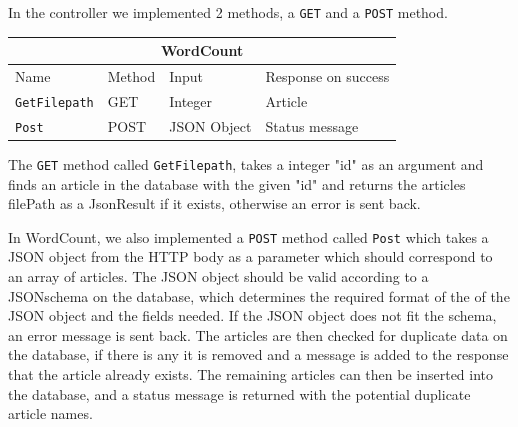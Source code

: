 In the controller we implemented 2 methods, a \texttt{GET} and a \texttt{POST} method.
\begin{table}[h]
    \begin{tabular}{|llll|}
    \hline
    \multicolumn{4}{|c|}{\textbf{WordCount}}                                                                                 \\ \hline
    \multicolumn{1}{|l|}{Name}                 & \multicolumn{1}{l|}{Method} & \multicolumn{1}{l|}{Input}       & Response on success       \\ \hline
    \multicolumn{1}{|l|}{\texttt{GetFilepath}} & \multicolumn{1}{l|}{GET}    & \multicolumn{1}{l|}{Integer}     & Article        \\ \hline
    \multicolumn{1}{|l|}{\texttt{Post}}        & \multicolumn{1}{l|}{POST}   & \multicolumn{1}{l|}{JSON Object} & Status message \\ \hline
    \end{tabular}
    \end{table}

The \texttt{GET} method called \texttt{GetFilepath}, takes a integer "id" as an argument and finds an article in the database with the given "id" and returns the articles filePath as a JsonResult if it exists, otherwise an error is sent back.


In WordCount, we also implemented a \texttt{POST} method called \texttt{Post} which takes a JSON object from the HTTP body as a parameter which should correspond to an array of articles. 
The JSON object should be valid according to a JSONschema on the database, which determines the required format of the of the JSON object and the fields needed. If the JSON object does not fit the schema, an error message is sent back. 
The articles are then checked for duplicate data on the database, if there is any it is removed and a message is added to the response that the article already exists. The remaining articles can then be inserted into the database, and a status message is returned with the potential duplicate article names. 
 
